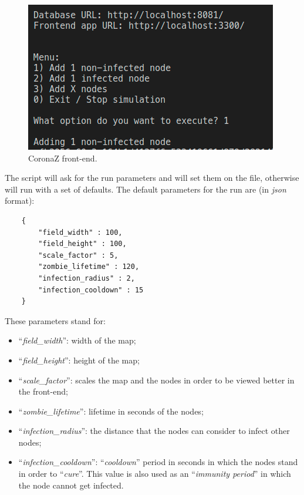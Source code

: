 \documentclass[conference]{IEEEtran}
\begin{document}
	\begin{figure}[htbp]
		\centerline{\includegraphics[width=\linewidth]{img/script.png}}
		\caption{CoronaZ front-end.}
		\label{fig:frontend}
	\end{figure}

	The script will ask for the run parameters and will set them on the file, otherwise will run with a set of defaults.
	The default parameters for the run are (in \textit{json} format):
	\begin{verbatim}
    {
        "field_width" : 100,
        "field_height" : 100,
        "scale_factor" : 5,
        "zombie_lifetime" : 120,
        "infection_radius" : 2,
        "infection_cooldown" : 15
    }
	\end{verbatim}
	
	These parameters stand for:
	\begin{itemize}
		\item ``\textit{field\_width}'': width of the map;
		\item ``\textit{field\_height}'': height of the map;
		\item ``\textit{scale\_factor}'': scales the map and the nodes in order to be viewed better in the front-end;
		\item ``\textit{zombie\_lifetime}'': lifetime in seconds of the nodes;
		\item ``\textit{infection\_radius}'': the distance that the nodes can consider to infect other nodes;
		\item ``\textit{infection\_cooldown}'': ``\textit{cooldown}'' period in seconds in which the nodes stand in order to ``\textit{cure}''. This value is also used as an ``\textit{immunity period}'' in which the node cannot get infected.
	\end{itemize}
	
\end{document}
